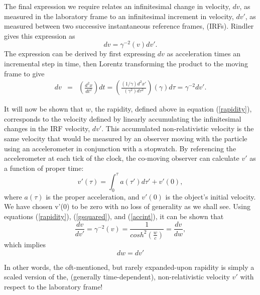 \documentclass[prb,preprint]{revtex4-1}
\begin{document}
The final expression we require relates an infinitesimal change in velocity, $dv$, as measured in the laboratory frame to an infinitesimal increment in velocity, $dv'$, as measured between two successive instantaneous reference frames, (IRFs).  Rindler gives this expression\cite{rindlerii} as
\begin{equation}
\label{gsquared}
dv=\gamma^{-2}\left(v\right)dv'.
\end{equation}
The expression can be derived by first expressing $dv$ as acceleration times an incremental step in time, then Lorentz transforming the product to the moving frame to give
\begin{eqnarray}
\label{gsquaredderiv}
dv& = &\left(\frac{d^2x}{dt^2}\right)dt = \left(\frac{\left(1/\gamma\right)d^2x'}{\left(\gamma^2\right)d\tau^2}\right)\left(\gamma\right)d\tau = \gamma^{-2}dv'.
\end{eqnarray}

It will now be shown that $w$, the rapidity, defined above in equation (\ref{rapidity}), corresponds to the velocity defined by linearly accumulating the infinitesimal changes in the IRF velocity, $dv'$.  This accumulated non-relativistic velocity  is the same velocity that would be measured by an observer moving with the particle using an accelerometer in conjunction with a stopwatch.   By referencing the accelerometer at each tick of the clock, the co-moving observer can calculate $v'$ as a function of proper time:
\begin{equation}
\label{accint}
v'\left(\tau\right)=\int_0^{\tau} \! a\left(\tau'\right)d\tau'+v'\left(0\right),
\end{equation}
where $a\left(\tau\right)$ is the proper acceleration, and $v'\left(0\right)$ is the object's initial velocity.  We have chosen v'(0) to be zero with no loss of generality as we shall see.  Using equations (\ref{rapidity}), (\ref{gsquared}), and (\ref{accint}), it can be shown that 
\begin{equation}
\frac{dv}{dv'}=\gamma^{-2}\left(v\right)=\frac{1}{cosh^2\left(\frac{w}{c}\right)}=\frac{dv}{dw},
\end{equation}
which implies
\begin{equation}
\label{rapnonrel}
dw=dv'
\end{equation}

In other words, the oft-mentioned, but rarely expanded-upon rapidity is simply a scaled version of the, (generally time-dependent), non-relativistic velocity $v'$ with respect to the laboratory frame!
\end{document}
